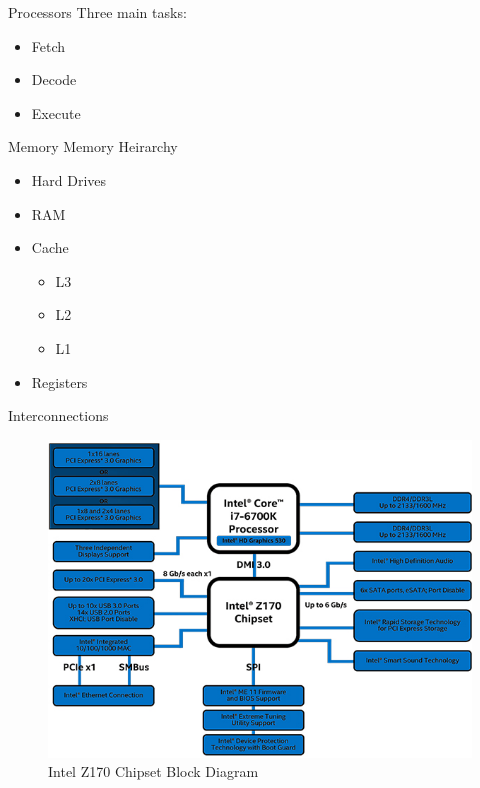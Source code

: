 \documentclass[serif,mathserif,compress]{beamer}
\begin{document}
\begin{frame}{Processors}
  Three main tasks:
  \begin{itemize}
  \item<1-> Fetch 
  \item<1-> Decode 
  \item<1-> Execute 
  \end{itemize}
\end{frame}

\begin{frame}{Memory}
  Memory Heirarchy
  \begin{itemize}
  \item<1-> Hard Drives 
  \item<3-> RAM 
  \item<5-> Cache 
    \begin{itemize}
    \item<7-> L3 
    \item<7-> L2 
    \item<7-> L1 
    \end{itemize}
  \item<9-> Registers
  \end{itemize}
\end{frame}

\begin{frame}{Interconnections}
  \begin{figure}
  \centering
  \includegraphics[height=0.7\textheight]{images/Intel-Z170-chipset-block-diagram.jpg}
  \caption{Intel Z170 Chipset Block Diagram}
  \label{fig:intel-z170-chipset}
  \end{figure}
\end{frame}
\end{document}
